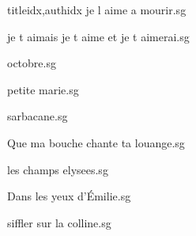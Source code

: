 \documentclass[
    ]{article}
\begin{document}
\begin{songs}{titleidx,authidx}
{je l aime a mourir.sg}


{je t aimais je t aime et je t aimerai.sg}


{octobre.sg}


{petite marie.sg}


{sarbacane.sg}


{Que ma bouche chante ta louange.sg}


{les champs elysees.sg}


{Dans les yeux d'Émilie.sg}


{siffler sur la colline.sg}



\end{songs}
\end{document}
